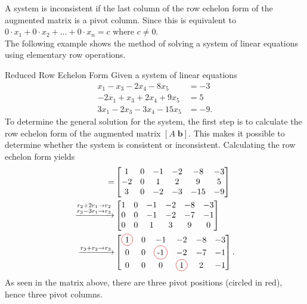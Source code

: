 A system is inconsistent if the last column of the row echelon form of the augmented matrix is a pivot column. Since this is equivalent to $0\cdot x_1+0\cdot x_2+\hdots + 0\cdot x_n=c$ where $c\neq 0$. \\
The following example shows the method of solving a system of linear equations using elementary row operations.
\begin{example}{Reduced Row Echelon Form}
Given a system of linear equations
\begin{align*}
    x_1-x_3-2x_4-8x_5&=-3\\
    -2x_1+x_3+2x_4+9x_5 &= 5\\
    3x_1-2x_3-3x_4-15x_5&=-9.
\end{align*}
To determine the general solution for the system, the first step is to calculate the row echelon form of the augmented matrix $[A\;\textbf{b}]$. This makes it possible to determine whether the system is consistent or inconsistent. Calculating the row echelon form yields
\begin{align*}
[A\;\textbf{b}] =
	&\begin{bmatrix}
	1  & 0  & -1  &-2  & -8  & -3 \\
	-2 & 0  & 1   & 2  & 9   & 5 \\
	3  & 0  & -2  & -3 & -15 & -9 
   \end{bmatrix} \\
  \xrightarrow{\substack{r_2+2r_1\rightarrow r_2\\  r_3-3r_1\rightarrow r_3}}
  &\begin{bmatrix}
 	 1 & 0 & -1 &-2  & -8 & -3 \\
 	 0 & 0 & -1 & -2 & -7 & -1 \\
	 0 & 0 & 1  & 3  & 9  & 0
  \end{bmatrix}\\
  \xrightarrow{r_3+r_2\rightarrow r_3}
    &\begin{bmatrix}
  	 \circled{1} & 0 & -1 &-2 & -8 & -3 \\
 	 0 & 0 & \circled{-1} & -2 & -7 & -1 \\
	 0 & 0 & 0 & \circled{1} & 2 & -1
       \end{bmatrix}.
\label{examplepivot}
\end{align*}
As seen in the matrix above, there are three pivot positions (circled in red), hence three pivot columns.


\end{example}
